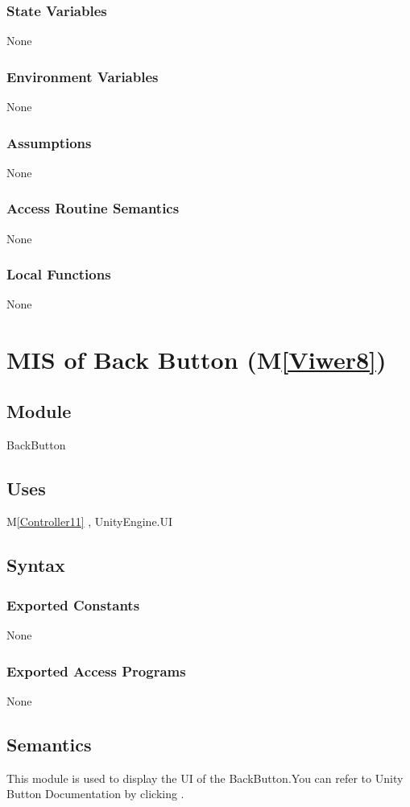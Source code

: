 \documentclass[12pt, titlepage]{article}
\newcommand{\mref}[1]{M\ref{#1}}
\begin{document}
\subsubsection{State Variables}
None
\subsubsection{Environment Variables}
None
\subsubsection{Assumptions}
None
\subsubsection{Access Routine Semantics}
None
\subsubsection{Local Functions}
None


\newpage

\section{MIS of Back Button (\mref{Viwer8})}

\subsection{Module}
BackButton

\subsection{Uses}
\mref{Controller11}  , UnityEngine.UI

\subsection{Syntax}
\subsubsection{Exported Constants}
None
\subsubsection{Exported Access Programs}
None

\subsection{Semantics}
This module is used to display the UI of the BackButton.You can refer to Unity Button Documentation by clicking \bref.
\end{document}
